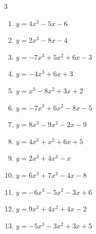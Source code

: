 \begin{multicols}{3}
\begin{enumerate}
  \item $y=4x^{3}-5x-6$


  \item $y=2x^{3}-8x-4$


  \item $y=-7x^{3}+5x^{2}+6x-3$


\columnbreak %

  \item $y=-4x^{3}+6x+3$


  \item $y=x^{3}-8x^{2}+3x+2$


  \item $y=-7x^{3}+6x^{2}-8x-5$


  \item $y=8x^{3}-9x^{2}-2x-9$


  \item $y=4x^{3}+x^{2}+6x+5$


  \item $y=2x^{3}+4x^{2}-x$


  \item $y=6x^{3}+7x^{2}-4x-8$


  \item $y=-6x^{3}-5x^{2}-3x+6$


  \item $y=9x^{3}+4x^{2}+4x-2$


  \item $y=-5x^{3}-3x^{2}+3x+5$


\end{enumerate}
\end{multicols}
